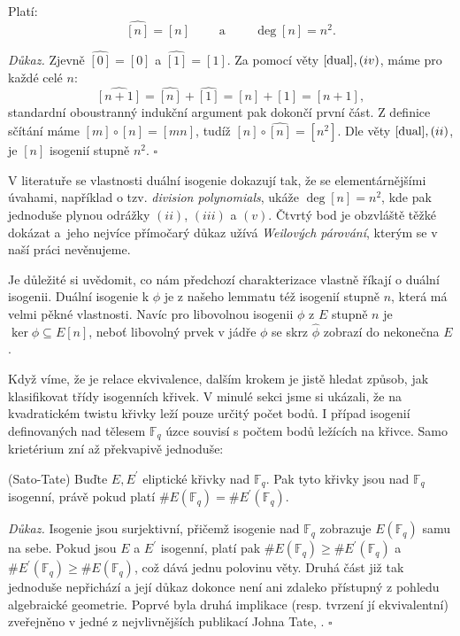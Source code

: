 \documentclass[12pt]{report}
\begin{document}
\begin{lemma}\label{deg}
Platí:
\begin{equation*}
\widehat{[n]} = [n] \qquad \text{ a } \qquad \deg [n] = n^2.
\end{equation*}
\end{lemma}
\noindent \textit{Důkaz. } Zjevně $\widehat{[0]} = [0]$ a $\widehat{[1]} = [1]$. Za pomocí věty $\ref{dual}, (iv)$, máme pro každé celé $n$:
\begin{equation*}
\widehat{[n+1]} =  \widehat{[n]} + \widehat{[1]} = [n]+[1] = [n+1],
\end{equation*} 
standardní oboustranný indukční argument pak dokončí první část. Z definice sčítání máme $[m] \circ [n] = [mn]$, tudíž $[n] \circ \widehat{[n]} = [n^2]$. Dle věty $\ref{dual}, (ii)$, je $[n]$ isogenií stupně $n^2$. \hfill $\square$\\

\begin{poznamka}
V literatuře se vlastnosti duální isogenie dokazují tak, že se elementárnějšími úvahami, například o tzv. \textit{division polynomials}, ukáže $\deg [n] = n^2$, kde pak jednoduše plynou odrážky $(ii)$, $(iii)$ a $(v)$. Čtvrtý bod je obzvláště těžké dokázat a~jeho nejvíce přímočarý důkaz užívá \textit{Weilových párování}, kterým se v naší práci nevěnujeme.
\end{poznamka}

Je důležité si uvědomit, co nám předchozí charakterizace vlastně říkají o duální isogenii. Duální isogenie k $\phi$ je z našeho lemmatu též isogenií stupně $n$, která má velmi pěkné vlastnosti. Navíc pro libovolnou isogenii $\phi$ z  $E$ stupně $n$ je $\ker \phi \subseteq E[n]$, neboť libovolný prvek v jádře $\phi$ se skrz $\hat{\phi}$ zobrazí do nekonečna $E$.

Když víme, že  je relace ekvivalence, dalším krokem je jistě hledat způsob, jak klasifikovat třídy isogenních křivek. V minulé sekci jsme si ukázali, že na kvadratickém twistu křivky leží pouze určitý počet bodů. I případ isogenií definovaných nad tělesem $\mathbb{F}_q$ úzce souvisí s počtem bodů ležících na křivce. Samo krietérium zní až překvapivě jednoduše:

\begin{veta}\label{satotate} (Sato-Tate)
Buďte $E,E^\prime$ eliptické křivky nad $\mathbb{F}_q$. Pak tyto křivky jsou nad $\mathbb{F}_q$ isogenní, právě pokud platí $\#E (\mathbb{F}_q) = \#E^\prime (\mathbb{F}_q)$.
\end{veta}
\noindent \textit{Důkaz.} Isogenie jsou surjektivní, přičemž isogenie nad $\mathbb{F}_q$ zobrazuje $E(\mathbb{F}_q)$ samu na sebe. Pokud jsou $E$ a $E^\prime$ isogenní, platí pak $\#E (\mathbb{F}_q) \geqslant \#E^\prime (\mathbb{F}_q)$ a $\#E^\prime (\mathbb{F}_q) \geqslant \#E (\mathbb{F}_q)$, což dává jednu polovinu věty. Druhá část již tak jednoduše nepřichází a její důkaz dokonce není ani zdaleko přístupný z pohledu algebraické geometrie. Poprvé byla druhá implikace (resp. tvrzení jí ekvivalentní) zveřejněno v jedné z nejvlivnějších publikací Johna Tate, \cite{Tate}. \hfill $\square$\\
\end{document}
